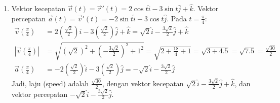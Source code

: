\documentclass[11pt,letterpaper]{article}
\begin{document}
\begin{enumerate}
\begin{enumerate}[label=\alph*.]
\begin{center}
                \end{center}
          \item Vektor kecepatan $\vec{v}(t) = \vec{r}'(t) = 2\cos t\hat{i} - 3\sin t\hat{j} + \hat{k}$.
                Vektor percepatan $\vec{a}(t) = \vec{v}'(t) = -2\sin t\hat{i} - 3\cos t\hat{j}$.
                Pada $t = \frac{\pi}{4}$:
                \begin{align*}
                  \vec{v}\left(\frac{\pi}{4}\right)   & = 2\left(\frac{\sqrt{2}}{2}\right)\hat{i} - 3\left(\frac{\sqrt{2}}{2}\right)\hat{j} + \hat{k} = \sqrt{2}\hat{i} - \frac{3\sqrt{2}}{2}\hat{j} + \hat{k} \\
                  |\vec{v}\left(\frac{\pi}{4}\right)| & = \sqrt{(\sqrt{2})^2 + \left(-\frac{3\sqrt{2}}{2}\right)^2 + 1^2} = \sqrt{2 + \frac{18}{4} + 1} = \sqrt{3 + 4.5} = \sqrt{7.5} = \frac{\sqrt{30}}{2}    \\
                  \vec{a}\left(\frac{\pi}{4}\right)   & = -2\left(\frac{\sqrt{2}}{2}\right)\hat{i} - 3\left(\frac{\sqrt{2}}{2}\right)\hat{j} = -\sqrt{2}\hat{i} - \frac{3\sqrt{2}}{2}\hat{j}
                \end{align*}
                Jadi, laju (speed) adalah $\frac{\sqrt{30}}{2}$, dengan vektor kecepatan $\sqrt{2}\hat{i} - \frac{3\sqrt{2}}{2}\hat{j} + \hat{k}$, dan vektor percepatan $-\sqrt{2}\hat{i} - \frac{3\sqrt{2}}{2}\hat{j}$.
        \end{enumerate}


\end{enumerate}
\end{document}
